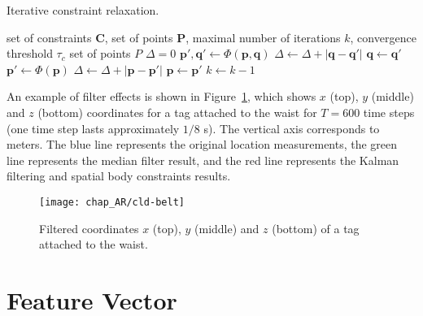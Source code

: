 \begin{algorithm}
\caption{Iterative constraint relaxation.}
\label{alg:LOF}
\begin{algorithmic}
\REQUIRE set of constraints $\mathbf{C}$, set of points $\mathbf{P}$, maximal number of iterations $k$, convergence threshold $\tau_c$
\ENSURE set of points $P$
\REPEAT
	\STATE $\Delta = 0$
			\STATE $\mathbf{p}', \mathbf{q}' \leftarrow \Phi(\mathbf{p}, \mathbf{q})$
			\STATE $\Delta \leftarrow \Delta + |\mathbf{q}-\mathbf{q}'|$
			\STATE $\mathbf{q} \leftarrow \mathbf{q}'$
		\ENDFOR
		\STATE $\mathbf{p}' \leftarrow \Phi(\mathbf{p})$
		\STATE $\Delta \leftarrow \Delta + |\mathbf{p}-\mathbf{p}'|$
		\STATE $\mathbf{p} \leftarrow \mathbf{p}'$
	\ENDFOR
	\STATE $k \gets k-1$
\end{algorithmic}
\end{algorithm}


An example of filter effects is shown in Figure~\ref{fig:noise}, which shows $x$ (top), $y$ (middle) and $z$ (bottom) coordinates for a tag attached to the waist for $T=600$ time steps (one time step lasts approximately $1/8$ s). The vertical axis corresponds to meters. The blue line represents the original location measurements, the green line represents the median filter result, and the red line represents the Kalman filtering and spatial body constraints results.
\begin{figure}[!h]
\centering
\texttt{[image: chap\_AR/cld-belt]}
\caption{Filtered coordinates $x$ (top), $y$ (middle) and $z$ (bottom) of a tag attached to the waist.}
\label{fig:noise}
\end{figure}


%
%
\section{Feature Vector}
\label{sec:ar:ml}


